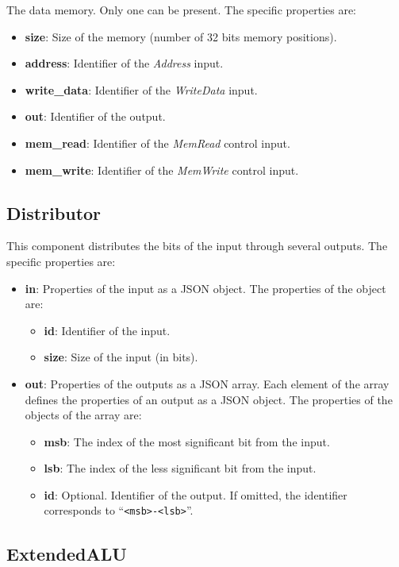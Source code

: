 \documentclass[11pt,a4paper,twoside,titlepage]{report}
\begin{document}
The data memory. Only one can be present. The specific properties are:
\begin{itemize}
	\item \textbf{size}: Size of the memory (number of 32 bits memory positions).
	\item \textbf{address}: Identifier of the \emph{Address} input.
	\item \textbf{write\_data}: Identifier of the \emph{WriteData} input.
	\item \textbf{out}: Identifier of the output.
	\item \textbf{mem\_read}: Identifier of the \emph{MemRead} control input.
	\item \textbf{mem\_write}: Identifier of the \emph{MemWrite} control input.
\end{itemize}

\subsection{Distributor}

This component distributes the bits of the input through several outputs.
The specific properties are:
\begin{itemize}
	\item \textbf{in}: Properties of the input as a JSON object.
		The properties of the object are:
		\begin{itemize}
			\item \textbf{id}: Identifier of the input.
			\item \textbf{size}: Size of the input (in bits).
		\end{itemize}
	\item \textbf{out}: Properties of the outputs as a JSON array.
		Each element of the array defines the properties of an output as a
		JSON object. The properties of the objects of the array are:
		\begin{itemize}
			\item \textbf{msb}: The index of the most significant bit from the input.
			\item \textbf{lsb}: The index of the less significant bit from the input.
			\item \textbf{id}: Optional. Identifier of the output. If omitted,
				the identifier corresponds to ``\verb+<msb>-<lsb>+''.
		\end{itemize}
\end{itemize}

\subsection{ExtendedALU}
\end{document}
